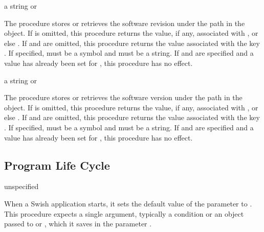 \begin{parameter}
\end{parameter}
\hasvalue{} a string or 

The  procedure stores or retrieves the software
revision under the path  in the
 object.
If  is omitted, this procedure returns the value, if any,
associated with , or else .
If  and  are omitted, this procedure returns the value
associated with the key .
If specified,  must be a symbol and  must be a string.
If  and  are specified and a value has already been
set for , this procedure has no effect.

\begin{parameter}
\end{parameter}
\hasvalue{} a string or 

The  procedure stores or retrieves the software
version under the path  in the
 object.
If  is omitted, this procedure returns the value, if any,
associated with , or else .
If  and  are omitted, this procedure returns the value
associated with the key .
If specified,  must be a symbol and  must be a string.
If  and  are specified and a value has already been
set for , this procedure has no effect.

\subsection{Program Life Cycle}

\begin{procedure}
\end{procedure}
\returns{} unspecified

When a Swish application starts, it sets the default value of the
 parameter to .
This procedure expects a single argument, typically a condition or an object
passed to  or , which it saves in the parameter .

